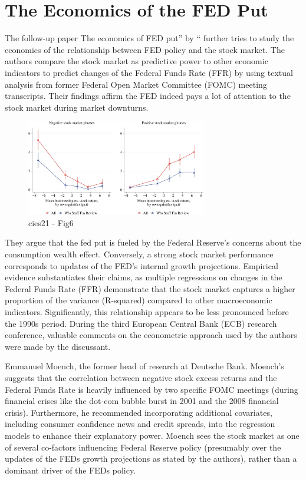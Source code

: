 \section{The Economics of the FED Put}

The follow-up paper The economics of FED put” by \parencite{cieslak_economics_2021}“ further tries to study the economics of the relationship between FED policy and the stock market. 
The authors compare the stock market as predictive power to other economic indicators to predict changes of the Federal Funds Rate (FFR) by using textual analysis from former Federal Open Market Committee (FOMC) meeting transcripts.
Their findings affirm the FED indeed pays a lot of attention to the stock market during market downturns.

\begin{figure}[h]
    \centering
    \includegraphics[width=0.7\textwidth]{figures/cies21/Figure6}
    \caption{cies21 - Fig6}
\end{figure}


They argue that the fed put is fueled by the Federal Reserve's concerns about the consumption wealth effect. Conversely, a strong stock market performance corresponds to updates of the FED’s internal growth projections.
Empirical evidence substantiates their claims, as multiple regressions on changes in the Federal Funds Rate (FFR) demonstrate that the stock market captures a higher proportion of the variance (R-squared) compared to other macroeconomic indicators. Significantly, this relationship appears to be less pronounced before the 1990s period.
During the third European Central Bank (ECB) research conference, valuable comments on the econometric approach used by the authors were made by the discussant.

 Emmanuel Moench, the former head of research at Deutsche Bank. Moench's suggests that the correlation between negative stock excess returns and the Federal Funds Rate is heavily influenced by two specific FOMC meetings (during financial crises like the dot-com bubble burst in 2001 and the 2008 financial crisis).
Furthermore, he recommended incorporating additional covariates, including consumer confidence news and credit spreads, into the regression models to enhance their explanatory power. Moench sees the stock market as one of several co-factors influencing Federal Reserve policy (presumably over the updates of the FEDs growth projections as stated by the authors), rather than a dominant driver of the FEDs policy.





